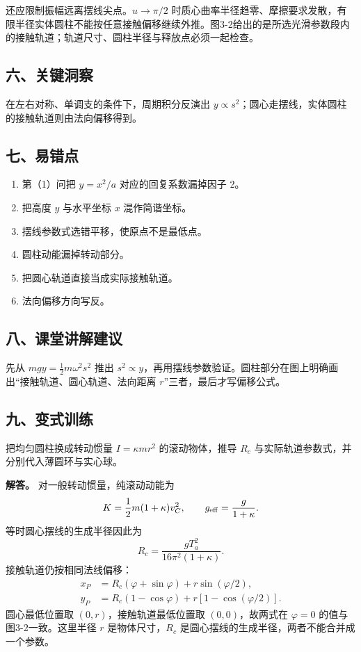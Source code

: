 \documentclass[12pt,a4paper,UTF8]{ctexart}
\newcommand{\tightlist}{\setlength{\itemsep}{0pt}\setlength{\parskip}{0pt}}
\begin{document}
还应限制振幅远离摆线尖点。\(u\to\pi/2\)
时质心曲率半径趋零、摩擦要求发散，有限半径实体圆柱不能按任意接触偏移继续外推。图3-2给出的是所选光滑参数段内的接触轨道；轨道尺寸、圆柱半径与释放点必须一起检查。

\subsection{六、关键洞察}\label{ux516dux5173ux952eux6d1eux5bdf-2}

在左右对称、单调支的条件下，周期积分反演出
\(y\propto s^2\)；圆心走摆线，实体圆柱的接触轨道则由法向偏移得到。

\subsection{七、易错点}\label{ux4e03ux6613ux9519ux70b9-2}

\begin{enumerate}
\def\labelenumi{\arabic{enumi}.}
\tightlist
\item
  第（1）问把 \(y=x^2/a\) 对应的回复系数漏掉因子 2。
\item
  把高度 \(y\) 与水平坐标 \(x\) 混作简谐坐标。
\item
  摆线参数式选错平移，使原点不是最低点。
\item
  圆柱动能漏掉转动部分。
\item
  把圆心轨道直接当成实际接触轨道。
\item
  法向偏移方向写反。
\end{enumerate}

\subsection{八、课堂讲解建议}\label{ux516bux8bfeux5802ux8bb2ux89e3ux5efaux8bae-2}

先从 \(mgy=\frac12m\omega^2s^2\) 推出
\(s^2\propto y\)，再用摆线参数验证。圆柱部分在图上明确画出``接触轨道、圆心轨道、法向距离
\(r\)''三者，最后才写偏移公式。

\subsection{九、变式训练}\label{ux4e5dux53d8ux5f0fux8badux7ec3-2}

把均匀圆柱换成转动惯量 \(I=\kappa mr^2\) 的滚动物体，推导 \(R_c\)
与实际轨道参数式，并分别代入薄圆环与实心球。

\textbf{解答。} 对一般转动惯量，纯滚动动能为 \[
K=\frac12m(1+\kappa)v_C^2,
\qquad g_{\rm eff}=\frac g{1+\kappa}.
\] 等时圆心摆线的生成半径因此为 \[
R_c=\frac{gT_a^2}{16\pi^2(1+\kappa)}.
\] 接触轨道仍按相同法线偏移： \[
\begin{aligned}
x_P&=R_c(\varphi+\sin\varphi)+r\sin(\varphi/2),\\
y_P&=R_c(1-\cos\varphi)+r[1-\cos(\varphi/2)].
\end{aligned}
\] 圆心最低位置取 \((0,r)\)，接触轨道最低位置取 \((0,0)\)，故两式在
\(\varphi=0\) 的值与图3-2一致。这里半径 \(r\) 是物体尺寸，\(R_c\)
是圆心摆线的生成半径，两者不能合并成一个参数。
\end{document}

